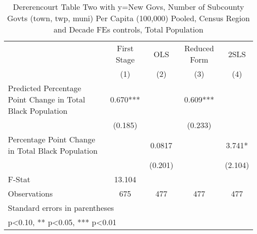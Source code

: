 \begin{table}[htbp]\centering
\def\sym#1{\ifmmode^{#1}\else\(^{#1}\)\fi}
\caption{Dererencourt Table Two with y=New Govs, Number of Subcounty Govts (town, twp, muni) Per Capita (100,000) Pooled, Census Region and Decade FEs controls, Total Population}
\begin{tabular}{l*{4}{c}}
\toprule
                    & First Stage   &         OLS   &Reduced Form   &        2SLS   \\
                    &\multicolumn{1}{c}{(1)}   &\multicolumn{1}{c}{(2)}   &\multicolumn{1}{c}{(3)}   &\multicolumn{1}{c}{(4)}   \\
\midrule
Predicted Percentage Point Change in Total Black Population&       0.670***&               &       0.609***&               \\
                    &     (0.185)   &               &     (0.233)   &               \\
\addlinespace
Percentage Point Change in Total Black Population&               &      0.0817   &               &       3.741*  \\
                    &               &     (0.201)   &               &     (2.104)   \\
\midrule
F-Stat              &      13.104   &               &               &               \\
Observations        &         675   &         477   &         477   &         477   \\
\bottomrule
\multicolumn{5}{l}{\footnotesize Standard errors in parentheses}\\
\multicolumn{5}{l}{\footnotesize * p<0.10, ** p<0.05, *** p<0.01}\\
\end{tabular}
\end{table}

